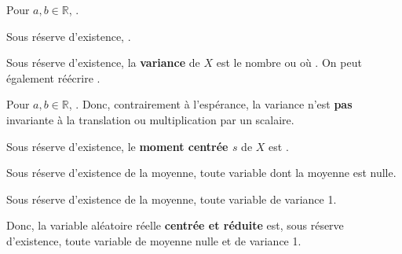 \documentclass[10pt, french]{report}
\begin{document}
\begin{multicols*}{2}
\begin{definitionNOHFILL}[Espérance]
\bigskip

\begin{definitionNOHFILLprop}
Pour $a, b \in \mathbb{R}$, .
\end{definitionNOHFILLprop}

\begin{definitionNOHFILLprop}
Sous réserve d'existence, .
\end{definitionNOHFILLprop}
\end{definitionNOHFILL}


\begin{definitionNOHFILL}[Variance]
Sous réserve d'existence, la \textbf{variance} de $X$ est le nombre  ou  où . On peut également réécrire .

\bigskip

\begin{definitionNOHFILLprop}
Pour $a, b \in \mathbb{R}$, . Donc, contrairement à l'espérance, la variance n'est \textbf{pas} invariante à la translation ou multiplication par un scalaire.

\end{definitionNOHFILLprop}
\end{definitionNOHFILL}


\begin{definitionNOHFILL}
Sous réserve d'existence, le \textbf{moment centrée $s$} de $X$ est .

\begin{definitionNOHFILLsub}
Sous réserve d'existence de la moyenne, toute variable dont la moyenne est nulle.
\end{definitionNOHFILLsub}
\begin{definitionNOHFILLsub}
Sous réserve d'existence de la moyenne, toute variable de variance 1.
\end{definitionNOHFILLsub}
Donc, la variable aléatoire réelle \textbf{centrée et réduite} est, sous réserve d'existence, toute variable de moyenne nulle et de variance 1.
\end{definitionNOHFILL}


\end{multicols*}
\end{document}
